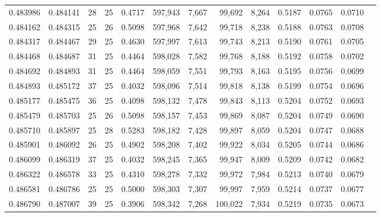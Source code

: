 \begin{tabular}{rrrrrrrrrrrrr}
0.483986 & 0.484141 &    28 &  25 &                                     0.4717 & 597,943 &   7,667 &  99,692 &   8,264 & 0.5187 & 0.0765 & 0.0710 \\
0.484162 & 0.484315 &    25 &  26 &                                     0.5098 & 597,968 &   7,642 &  99,718 &   8,238 & 0.5188 & 0.0763 & 0.0708 \\
0.484317 & 0.484467 &    29 &  25 &                                     0.4630 & 597,997 &   7,613 &  99,743 &   8,213 & 0.5190 & 0.0761 & 0.0705 \\
0.484468 & 0.484687 &    31 &  25 &                                     0.4464 & 598,028 &   7,582 &  99,768 &   8,188 & 0.5192 & 0.0758 & 0.0702 \\
0.484692 & 0.484893 &    31 &  25 &                                     0.4464 & 598,059 &   7,551 &  99,793 &   8,163 & 0.5195 & 0.0756 & 0.0699 \\
0.484893 & 0.485172 &    37 &  25 &                                     0.4032 & 598,096 &   7,514 &  99,818 &   8,138 & 0.5199 & 0.0754 & 0.0696 \\
0.485177 & 0.485475 &    36 &  25 &                                     0.4098 & 598,132 &   7,478 &  99,843 &   8,113 & 0.5204 & 0.0752 & 0.0693 \\
0.485479 & 0.485703 &    25 &  26 &                                     0.5098 & 598,157 &   7,453 &  99,869 &   8,087 & 0.5204 & 0.0749 & 0.0690 \\
0.485710 & 0.485897 &    25 &  28 &                                     0.5283 & 598,182 &   7,428 &  99,897 &   8,059 & 0.5204 & 0.0747 & 0.0688 \\
0.485901 & 0.486092 &    26 &  25 &                                     0.4902 & 598,208 &   7,402 &  99,922 &   8,034 & 0.5205 & 0.0744 & 0.0686 \\
0.486099 & 0.486319 &    37 &  25 &                                     0.4032 & 598,245 &   7,365 &  99,947 &   8,009 & 0.5209 & 0.0742 & 0.0682 \\
0.486322 & 0.486578 &    33 &  25 &                                     0.4310 & 598,278 &   7,332 &  99,972 &   7,984 & 0.5213 & 0.0740 & 0.0679 \\
0.486581 & 0.486786 &    25 &  25 &                                     0.5000 & 598,303 &   7,307 &  99,997 &   7,959 & 0.5214 & 0.0737 & 0.0677 \\
0.486790 & 0.487007 &    39 &  25 &                                     0.3906 & 598,342 &   7,268 & 100,022 &   7,934 & 0.5219 & 0.0735 & 0.0673 \\

\end{tabular}
